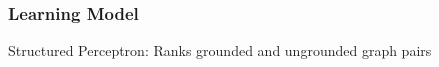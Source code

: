 \documentclass[mathserif,12pt]{beamer}
\newcommand{\hlight}[1]{{\color{blue!80} #1}}
\begin{document}
\begin{frame}
\frametitle{Learning Model}
\large

\hlight{Structured Perceptron:} Ranks grounded and ungrounded graph pairs 

\end{frame}
\end{document}
